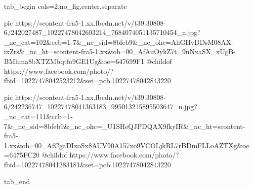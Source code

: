  
 
 
 
 


\ifcmt
  tab_begin cols=2,no_fig,center,separate

     pic https://scontent-fra5-1.xx.fbcdn.net/v/t39.30808-6/242027487_10227478042603214_7684074051135710454_n.jpg?_nc_cat=102&ccb=1-7&_nc_sid=8bfeb9&_nc_ohc=AhGHvDDsM08AX-ixZrs&_nc_ht=scontent-fra5-1.xx&oh=00_AfAuOykZ7t_9nNxaSX_xUgB-BMhma8bXTZMbqtfo9GE1Ug&oe=647699F1
     @childof https://www.facebook.com/photo/?fbid=10227478042523212&set=pcb.10227478042843220

     pic https://scontent-fra5-1.xx.fbcdn.net/v/t39.30808-6/242236747_10227478041363183_995013215895503647_n.jpg?_nc_cat=111&ccb=1-7&_nc_sid=8bfeb9&_nc_ohc=_U1SHeQJPDQAX9fkyIR&_nc_ht=scontent-fra5-1.xx&oh=00_AfCgaDIxoSx8AUV90A157xo9VCOLjkRL7rBDmFLLoAZTXg&oe=6475FC20
     @childof https://www.facebook.com/photo/?fbid=10227478041283181&set=pcb.10227478042843220

  tab_end
\fi
